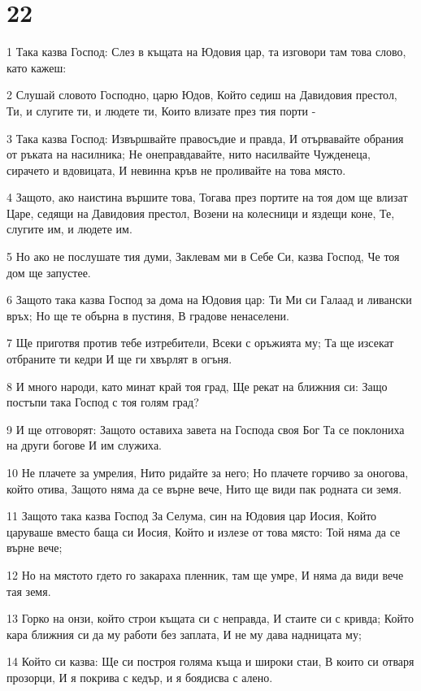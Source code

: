 \chapter{22}

\par 1 Така казва Господ: Слез в къщата на Юдовия цар, та изговори там това слово, като кажеш:
\par 2 Слушай словото Господно, царю Юдов, Който седиш на Давидовия престол, Ти, и слугите ти, и людете ти, Които влизате през тия порти -
\par 3 Така казва Господ: Извършвайте правосъдие и правда, И отървавайте обрания от ръката на насилника; Не онеправдавайте, нито насилвайте Чужденеца, сирачето и вдовицата, И невинна кръв не проливайте на това място.
\par 4 Защото, ако наистина вършите това, Тогава през портите на тоя дом ще влизат Царе, седящи на Давидовия престол, Возени на колесници и яздещи коне, Те, слугите им, и людете им.
\par 5 Но ако не послушате тия думи, Заклевам ми в Себе Си, казва Господ, Че тоя дом ще запустее.
\par 6 Защото така казва Господ за дома на Юдовия цар: Ти Ми си Галаад и ливански връх; Но ще те обърна в пустиня, В градове ненаселени.
\par 7 Ще приготвя против тебе изтребители, Всеки с оръжията му; Та ще изсекат отбраните ти кедри И ще ги хвърлят в огъня.
\par 8 И много народи, като минат край тоя град, Ще рекат на ближния си: Защо постъпи така Господ с тоя голям град?
\par 9 И ще отговорят: Защото оставиха завета на Господа своя Бог Та се поклониха на други богове И им служиха.
\par 10 Не плачете за умрелия, Нито ридайте за него; Но плачете горчиво за оногова, който отива, Защото няма да се върне вече, Нито ще види пак родната си земя.
\par 11 Защото така казва Господ За Селума, син на Юдовия цар Иосия, Който царуваше вместо баща си Иосия, Който и излезе от това място: Той няма да се върне вече;
\par 12 Но на мястото гдето го закараха пленник, там ще умре, И няма да види вече тая земя.
\par 13 Горко на онзи, който строи къщата си с неправда, И стаите си с кривда; Който кара ближния си да му работи без заплата, И не му дава надницата му;
\par 14 Който си казва: Ще си построя голяма къща и широки стаи, В които си отваря прозорци, И я покрива с кедър, и я боядисва с алено.

